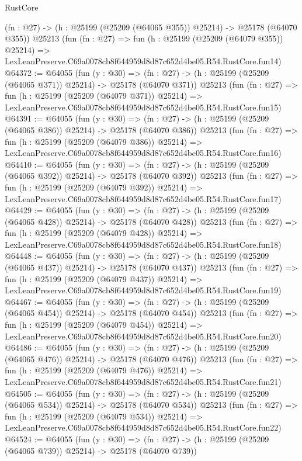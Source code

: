 \begin{lexlean}{RustCore}
\begin{coremodule}
    (fn : @27) -> (h : @25199 (@25209 (@64065 @355)) @25214) -> @25178 (@64070 @355))
    @25213
    (fun (fn : @27) =>
    fun (h : @25199 (@25209 (@64079 @355)) @25214) =>
    LexLeanPreserve.C69a0078cb8f644959d8d87c652d4be05.R54.RustCore.fun14)
@64372 := @64055
    (fun (y : @30) =>
    (fn : @27) -> (h : @25199 (@25209 (@64065 @371)) @25214) -> @25178 (@64070 @371))
    @25213
    (fun (fn : @27) =>
    fun (h : @25199 (@25209 (@64079 @371)) @25214) =>
    LexLeanPreserve.C69a0078cb8f644959d8d87c652d4be05.R54.RustCore.fun15)
@64391 := @64055
    (fun (y : @30) =>
    (fn : @27) -> (h : @25199 (@25209 (@64065 @386)) @25214) -> @25178 (@64070 @386))
    @25213
    (fun (fn : @27) =>
    fun (h : @25199 (@25209 (@64079 @386)) @25214) =>
    LexLeanPreserve.C69a0078cb8f644959d8d87c652d4be05.R54.RustCore.fun16)
@64410 := @64055
    (fun (y : @30) =>
    (fn : @27) -> (h : @25199 (@25209 (@64065 @392)) @25214) -> @25178 (@64070 @392))
    @25213
    (fun (fn : @27) =>
    fun (h : @25199 (@25209 (@64079 @392)) @25214) =>
    LexLeanPreserve.C69a0078cb8f644959d8d87c652d4be05.R54.RustCore.fun17)
@64429 := @64055
    (fun (y : @30) =>
    (fn : @27) -> (h : @25199 (@25209 (@64065 @428)) @25214) -> @25178 (@64070 @428))
    @25213
    (fun (fn : @27) =>
    fun (h : @25199 (@25209 (@64079 @428)) @25214) =>
    LexLeanPreserve.C69a0078cb8f644959d8d87c652d4be05.R54.RustCore.fun18)
@64448 := @64055
    (fun (y : @30) =>
    (fn : @27) -> (h : @25199 (@25209 (@64065 @437)) @25214) -> @25178 (@64070 @437))
    @25213
    (fun (fn : @27) =>
    fun (h : @25199 (@25209 (@64079 @437)) @25214) =>
    LexLeanPreserve.C69a0078cb8f644959d8d87c652d4be05.R54.RustCore.fun19)
@64467 := @64055
    (fun (y : @30) =>
    (fn : @27) -> (h : @25199 (@25209 (@64065 @454)) @25214) -> @25178 (@64070 @454))
    @25213
    (fun (fn : @27) =>
    fun (h : @25199 (@25209 (@64079 @454)) @25214) =>
    LexLeanPreserve.C69a0078cb8f644959d8d87c652d4be05.R54.RustCore.fun20)
@64486 := @64055
    (fun (y : @30) =>
    (fn : @27) -> (h : @25199 (@25209 (@64065 @476)) @25214) -> @25178 (@64070 @476))
    @25213
    (fun (fn : @27) =>
    fun (h : @25199 (@25209 (@64079 @476)) @25214) =>
    LexLeanPreserve.C69a0078cb8f644959d8d87c652d4be05.R54.RustCore.fun21)
@64505 := @64055
    (fun (y : @30) =>
    (fn : @27) -> (h : @25199 (@25209 (@64065 @534)) @25214) -> @25178 (@64070 @534))
    @25213
    (fun (fn : @27) =>
    fun (h : @25199 (@25209 (@64079 @534)) @25214) =>
    LexLeanPreserve.C69a0078cb8f644959d8d87c652d4be05.R54.RustCore.fun22)
@64524 := @64055
    (fun (y : @30) =>
    (fn : @27) -> (h : @25199 (@25209 (@64065 @739)) @25214) -> @25178 (@64070 @739))

\end{coremodule}
\end{lexlean}
